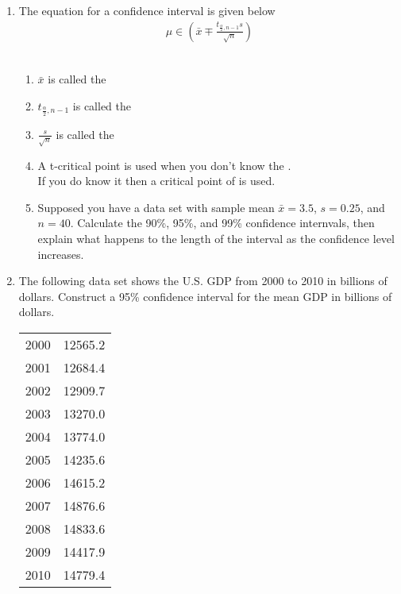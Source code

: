 
\begin{enumerate}
\item The equation for a confidence interval is given below
\begin{eqnarray*}
\mu \in \left( \bar{x} \mp \frac{t_{\frac{\alpha}{2},n-1}s}{\sqrt{n}}\right)
\end{eqnarray*} \\
\begin{enumerate}
\item $\bar{x}$ is called the\noindent\hrulefill \\
\item $t_{\frac{\alpha}{2},n-1}$ is called the \noindent\hrulefill \\
\item $\frac{s}{\sqrt{n}}$ is called the \noindent\hrulefill \\
\item A t-critical point is used when you don't know the \noindent\hrulefill .\\ If you do know it then a critical point of \noindent\hrulefill is used.
\item Supposed you have a data set with sample mean $\bar{x} = 3.5$, $s=0.25$, and $n=40$. Calculate the 90\%, 95\%, and 99\% confidence internvals, then explain what happens to the length of the interval as the confidence level increases.
\end{enumerate}
\item The following data set shows the U.S. GDP from 2000 to 2010 in billions of dollars. Construct a 95\% confidence interval for the mean GDP in billions of dollars. 
\begin{table}[h]
    \begin{tabular}{ll}
   2000 &12565.2 \\
  2001  &12684.4 \\
   2002 &12909.7 \\
   2003 &13270.0 \\
    2004 &13774.0 \\
  2005  &14235.6 \\
   2006 &14615.2 \\
   2007 &14876.6 \\
   2008 &14833.6 \\
   2009 &14417.9 \\
   2010 &14779.4 \\
    \end{tabular}
\end{table}
\end{enumerate}

